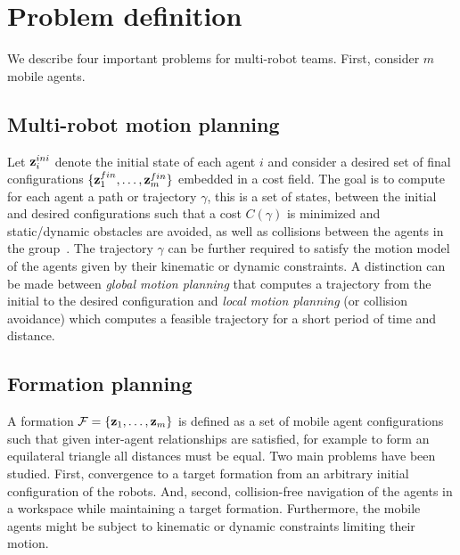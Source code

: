
\section{Problem definition}\label{sec:2}

We describe four important problems for multi-robot teams. First, consider $m$ mobile agents. 

\subsection{Multi-robot motion planning}
Let $\textbf{z}^{ini}_i$ denote the initial state of each agent $i$ and consider a desired set of final configurations $\{\textbf{z}^{fin}_1,  \dots, \textbf{z}^{fin}_m \}$ embedded in a cost field.
The goal is to compute for each agent a path or trajectory $\gamma$, this is a set of states, between the initial and desired configurations such that a cost $C(\gamma)$ is minimized and static/dynamic obstacles are avoided, as well as collisions between the agents in the group~\citet{lavalle06}. The trajectory $\gamma$ can be further required to satisfy the motion model of the agents given by their kinematic or dynamic constraints.
A distinction can be made between \emph{global motion planning} that computes a trajectory from the initial to the desired configuration and \emph{local motion planning} (or collision avoidance) which computes a feasible trajectory for a short period of time and distance.

\subsection{Formation planning}
A formation $\mathcal{F} = \{ \textbf{z}_1,  \dots, \textbf{z}_m \}$ is defined as a set of mobile agent configurations such that given inter-agent relationships are satisfied, for example to form an equilateral triangle all distances must be equal.
Two main problems have been studied. First, convergence to a target formation from an arbitrary initial configuration of the robots. And, second, collision-free navigation of the agents in a workspace while maintaining a target formation. Furthermore, the mobile agents might be subject to kinematic or dynamic constraints limiting their motion.

